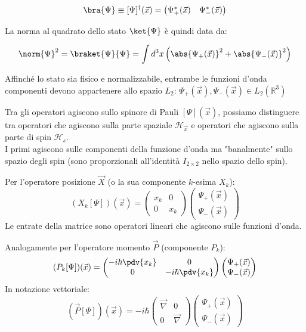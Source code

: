 \[
\bra{\Psi} \equiv [\Psi]^\dagger(\vec{x}) = \begin{pmatrix} \Psi_+^*(\vec{x}) & \Psi_-^*(\vec{x}) \end{pmatrix}
\]


La norma al quadrato dello stato \( \ket{\Psi} \) è quindi data da:

\[
\norm{\Psi}^2 = \braket{\Psi}{\Psi} = \int d^3x \left( \abs{\Psi_+(\vec{x})}^2 + \abs{\Psi_-(\vec{x})}^2 \right)
\]

Affinché lo stato sia fisico e normalizzabile, entrambe le funzioni d'onda componenti devono appartenere allo spazio \( L_2 \):
\(
\Psi_+(\vec{x}), \Psi_-(\vec{x}) \in L_2(\mathbb{R}^3)
\)

Tra gli operatori agiscono sullo spinore di Pauli $[\Psi](\vec{x})$, possiamo distinguere tra operatori che agiscono sulla parte spaziale \( \mathcal{H}_{\vec{x}} \) e operatori che agiscono sulla parte di spin \( \mathcal{H}_s \).\\
I primi agiscono sulle componenti della funzione d'onda ma "banalmente" sullo spazio degli spin (sono proporzionali all'identità \( I_{2\times 2} \) nello spazio dello spin).

Per l'operatore posizione \( \vec{X} \) (o la sua componente \( k \)-esima \( X_k \)):
\[
(X_k [\Psi])(\vec{x}) = \begin{pmatrix} x_k & 0 \\ 0 & x_k \end{pmatrix} \begin{pmatrix} \Psi_+(\vec{x}) \\ \Psi_-(\vec{x}) \end{pmatrix} 
\]
Le entrate della matrice sono operatori lineari che agiscono sulle funzioni d'onda.

Analogamente per l'operatore momento \( \vec{P} \) (componente \( P_k \)):
\[
(P_k [\Psi])(\vec{x}) = \begin{pmatrix} -i\hbar \pdv{x_k} & 0 \\ 0 & -i\hbar \pdv{x_k} \end{pmatrix} \begin{pmatrix} \Psi_+(\vec{x}) \\ \Psi_-(\vec{x}) \end{pmatrix} 
\]
In notazione vettoriale:
\[
(\vec{P} [\Psi])(\vec{x}) = -i\hbar \begin{pmatrix} \vec{\nabla} & 0 \\ 0 & \vec{\nabla} \end{pmatrix} \begin{pmatrix} \Psi_+(\vec{x}) \\ \Psi_-(\vec{x}) \end{pmatrix}
\]


